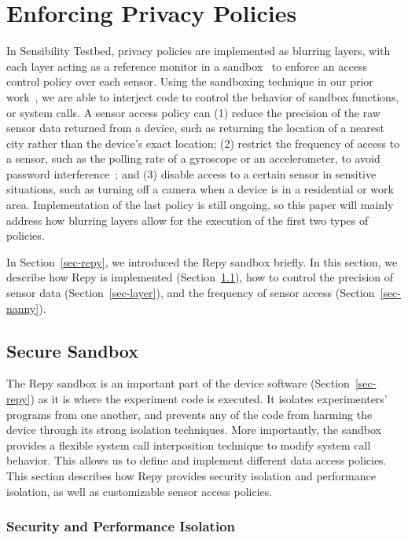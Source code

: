 \section{Enforcing Privacy Policies}\label{sec-policy}

In Sensibility Testbed, privacy policies are implemented as blurring layers, with each layer acting as a 
reference monitor in a sandbox~\cite{ref} to enforce an access 
control policy over each sensor. Using the sandboxing 
technique in our prior work~\cite{cappos2010retaining}, we are able to
interject code to control the behavior of sandbox functions, or 
system calls. A sensor access policy can (1) reduce 
the precision of the raw sensor data returned from a device, such
as returning the location of a nearest city rather than the device's exact location; (2) restrict 
the frequency of access to a sensor, such as the polling rate of a gyroscope or
an accelerometer, to avoid password interference~\cite{michalevsky2014gyrophone}; and (3) disable  
access to a certain sensor in sensitive situations, such as 
turning off a camera when a device is in a residential or work area.
Implementation of the last policy is still ongoing, so this paper will mainly address
how blurring layers allow for the execution of the first two types of policies. 

In Section~\ref{sec-repy}, we introduced the Repy sandbox briefly. 
In this section, we describe how Repy is implemented
(Section~\ref{sec-repy-ext}), 
how to control the precision of sensor data (Section~\ref{sec-layer}), 
and the frequency of sensor access (Section~\ref{sec-nanny}).

\subsection{Secure Sandbox}\label{sec-repy-ext}

The Repy sandbox is an important part of the device software 
(Section~\ref{sec-repy}) as it is where the experiment code is executed. It isolates experimenters' programs from one 
another, and prevents any of the code from harming the device 
through its strong isolation techniques. More importantly, the sandbox
provides a flexible system call interposition technique to modify system call behavior. This allows us to define and implement
different data access policies. This section describes how Repy provides
security isolation and performance isolation, as well as customizable
sensor access policies.

\subsubsection{Security and Performance Isolation}

